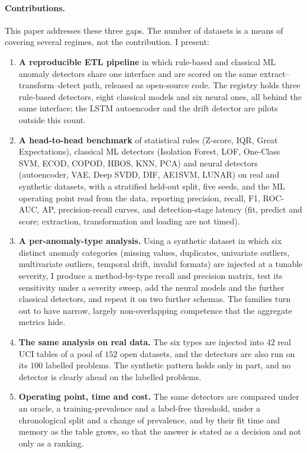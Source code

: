 \documentclass[conference]{IEEEtran}
\begin{document}
\paragraph{Contributions.} This paper addresses these three gaps. The number of datasets is a means of covering several regimes,
not the contribution. I present:
\begin{enumerate}
    \item \textbf{A reproducible ETL pipeline} in which rule-based and
    classical ML anomaly detectors share one interface and are scored on
    the same extract--transform--detect path, released as open-source
    code. The registry holds three rule-based detectors, eight classical
    models and six neural ones, all behind the same interface; the LSTM autoencoder and the
    drift detector are pilots outside this count.
    \item \textbf{A head-to-head benchmark} of statistical rules
    (Z-score, IQR, Great Expectations), classical ML detectors
    (Isolation Forest, LOF, One-Class SVM, ECOD, COPOD, HBOS, KNN, PCA) and neural
    detectors (autoencoder, VAE, Deep SVDD, DIF, AE1SVM, LUNAR) on real and synthetic datasets, with a
    stratified held-out split, five seeds, and the ML operating point
    read from the data, reporting precision, recall, F1, ROC-AUC, AP,
    precision-recall curves, and detection-stage latency (fit, predict and
    score; extraction, transformation and loading are not timed).
    \item \textbf{A per-anomaly-type analysis.} Using a synthetic
    dataset in which six distinct anomaly categories (missing values,
    duplicates, univariate outliers, multivariate outliers, temporal
    drift, invalid formats) are injected at a tunable severity, I produce
    a method-by-type recall and precision matrix, test its sensitivity
    under a severity sweep, add the neural models and the further classical detectors, and repeat it on two
    further schemas. The families turn out to have narrow, largely
    non-overlapping competence that the aggregate metrics hide.
    \item \textbf{The same analysis on real data.} The six types are
    injected into $42$ real UCI tables of a pool of $152$ open datasets, and the
    detectors are also run on its $100$ labelled problems. The synthetic
    pattern holds only in part, and no detector is clearly ahead on the
    labelled problems.
    \item \textbf{Operating point, time and cost.} The same detectors are compared under an
    oracle, a training-prevalence and a label-free threshold, under a chronological split and a
    change of prevalence, and by their fit time and memory as the table grows, so that the
    answer is stated as a decision and not only as a ranking.
\end{enumerate}
\end{document}
